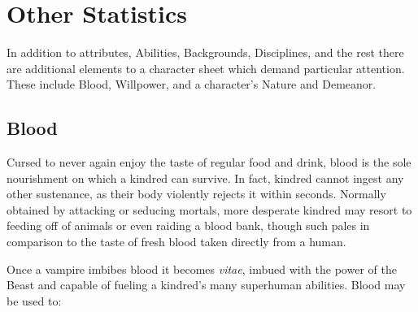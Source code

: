 \section{Other Statistics}
\label{sec:other}
In addition to attributes, Abilities, Backgrounds, Disciplines, and 
the rest there are additional elements to a character sheet which 
demand particular attention.  These include Blood, Willpower, and a 
character's Nature and Demeanor. 

\subsection{Blood}
\label{subsec:blood}
Cursed to never again enjoy the taste of regular food and drink, blood 
is the sole nourishment on which a kindred can survive.  In fact, kindred 
cannot ingest any other sustenance, as their body violently rejects it within 
seconds.  Normally obtained by attacking or seducing mortals, more desperate 
kindred may resort to feeding off of animals or even raiding a blood bank, 
though such pales in comparison to the taste of fresh blood taken directly 
from a human.

Once a vampire imbibes blood it becomes \emph{vitae}, imbued with the 
power of the Beast and capable of fueling a kindred's many superhuman 
abilities.  Blood may be used to: \\ 

